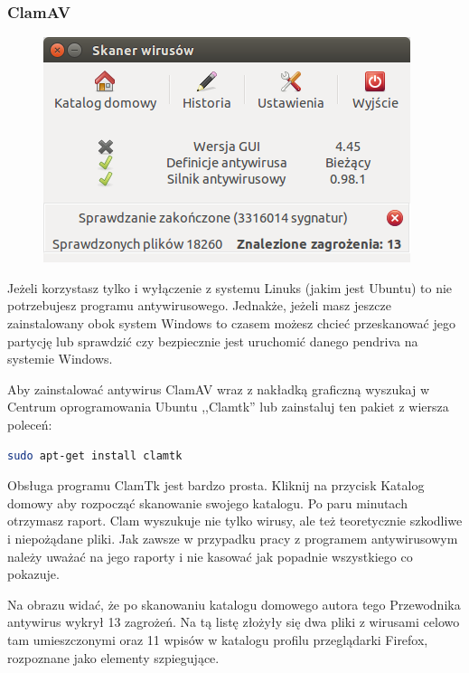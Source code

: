 \subsubsection{ClamAV}
\begin{figure}
	\vspace{-10pt}
	\includegraphics[width=\linewidth]{images/programy_clam.png}
\end{figure}
Jeżeli korzystasz tylko i wyłączenie z systemu Linuks (jakim jest Ubuntu) to nie potrzebujesz programu antywirusowego. Jednakże, jeżeli masz jeszcze zainstalowany obok system Windows to czasem możesz chcieć przeskanować jego partycję lub sprawdzić czy bezpiecznie jest uruchomić danego pendriva na systemie Windows.

Aby zainstalować antywirus \textcolor{ubuntu_orange}{ClamAV} wraz z nakładką graficzną wyszukaj w Centrum oprogramowania Ubuntu ,,Clamtk'' lub zainstaluj ten pakiet z wiersza poleceń:
\begin{lstlisting}[language=bash]
sudo apt-get install clamtk
\end{lstlisting}

Obsługa programu ClamTk jest bardzo prosta. Kliknij na przycisk \textcolor{ubuntu_orange}{Katalog domowy} aby rozpocząć skanowanie swojego katalogu. Po paru minutach otrzymasz raport. Clam wyszukuje nie tylko wirusy, ale też teoretycznie szkodliwe i niepożądane pliki. Jak zawsze w przypadku pracy z programem antywirusowym należy uważać na jego raporty i nie kasować jak popadnie wszystkiego co pokazuje.

Na obrazu widać, że po skanowaniu katalogu domowego autora tego Przewodnika antywirus wykrył 13 zagrożeń. Na tą listę złożyły się dwa pliki z wirusami celowo tam umieszczonymi oraz 11 wpisów w katalogu profilu przeglądarki Firefox, rozpoznane jako elementy szpiegujące.

